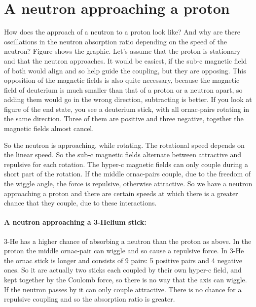 \section{A neutron approaching a proton}


How does the approach of a neutron to a proton look like? And why are there oscillations in the neutron absorption ratio depending on the speed of the neutron? Figure shows the graphic.
Let's assume that the proton is stationary and that the neutron approaches. It would be easiest, if the sub-c magnetic field of both would align and so help guide the coupling, but they are opposing. This opposition of the magnetic fields is also quite necessary, because the magnetic field of deuterium is much smaller than that of a proton or a neutron apart, so adding them would go in the wrong direction, subtracting is better. If you look at figure of the end state, you see a deuterium stick, with all ornac-pairs rotating in the same direction. Three of them are positive and three negative, together the magnetic fields almost cancel.

So the neutron is approaching, while rotating. The rotational speed depends on the linear speed. So the sub-c magnetic fields alternate between attractive and repulsive for each rotation. The hyper-c magnetic fields can only couple during a short part of the rotation. If the middle ornac-pairs couple, due to the freedom of the wiggle angle, the force is repulsive, otherwise attractive. So we have a neutron approaching a proton and there are certain speeds at which there is a greater chance that they couple, due to these interactions.

\paragraph{A neutron approaching a 3-Helium stick:}
3-He has a higher chance of absorbing a neutron than the proton as above. In the proton the middle ornac-pair can wiggle and so cause a repulsive force. In 3-He the ornac stick is longer and consists of 9 pairs: 5 positive pairs and 4 negative ones. So it are actually two sticks each coupled by their own hyper-c field, and kept together by the Coulomb force, so there is no way that the axis can wiggle. If the neutron passes by it can only couple attractive. There is no chance for a repulsive coupling and so the absorption ratio is greater.

